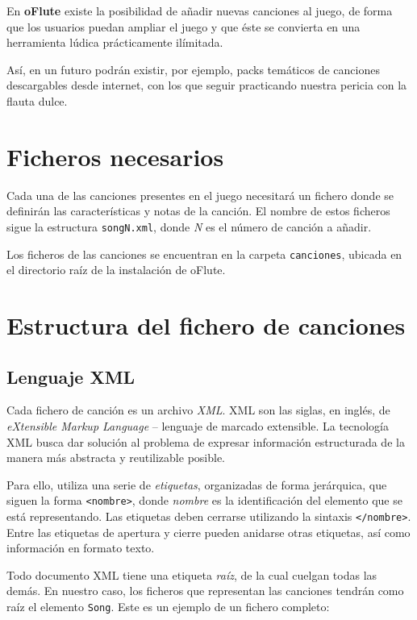 En \textbf{oFlute} existe la posibilidad de añadir nuevas canciones al juego, de
forma que los usuarios puedan ampliar el juego y que éste se convierta en una
herramienta lúdica prácticamente ilímitada.

Así, en un futuro podrán existir, por ejemplo, packs temáticos de canciones
descargables desde internet, con los que seguir practicando nuestra pericia con
la flauta dulce.

\section{Ficheros necesarios}

Cada una de las canciones presentes en el juego necesitará un fichero donde se
definirán las características y notas de la canción. El nombre de estos ficheros
sigue la estructura \texttt{songN.xml}, donde \textit{N} es el número de canción
a añadir.

Los ficheros de las canciones se encuentran en la carpeta \texttt{canciones},
ubicada en el directorio raíz de la instalación de oFlute. 

\section{Estructura del fichero de canciones}

\subsection{Lenguaje XML}
\label{sec:lenguaje-xml}

Cada fichero de canción es un archivo \textit{XML}.  XML
son las siglas, en inglés, de \textit{eXtensible Markup Language} -- lenguaje de
marcado extensible. La tecnología XML busca dar solución al problema de expresar
información estructurada de la manera más abstracta y reutilizable posible. 

Para ello, utiliza una serie de \textit{etiquetas}, organizadas de forma
jerárquica, que siguen la forma \texttt{<nombre>}, donde \textit{nombre} es la
identificación del elemento que se está representando. Las etiquetas deben
cerrarse utilizando la sintaxis \texttt{</nombre>}. Entre las etiquetas de
apertura y cierre pueden anidarse otras etiquetas, así como información en
formato texto.

Todo documento XML tiene una etiqueta \textit{raíz}, de la cual cuelgan todas
las demás. En nuestro caso, los ficheros que representan las canciones tendrán
como raíz el elemento \texttt{Song}. Este es un ejemplo de un fichero completo:



